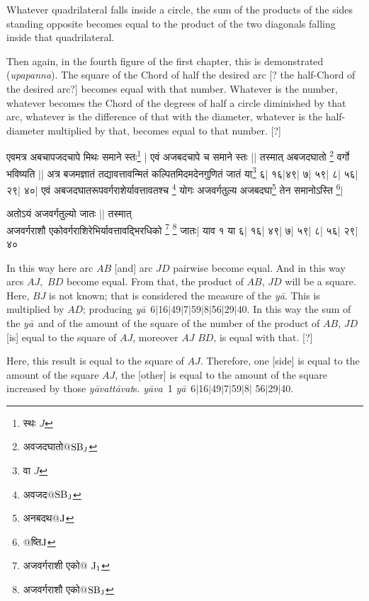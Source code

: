 \documentclass[11pt,a5paper]{book}
\def\yavattavat{\textit{y\=avatt\=avat}}
\def\ya{\textit{y\=a}}
\def\yava{\textit{y\=ava}}
\def\danda{$|$}
\begin{document}
Whatever quadrilateral falls inside a circle, the sum of the 
products of the sides standing opposite becomes equal to the
product of the two diagonals falling inside that quadrilateral. 

Then again, in the fourth figure of the first chapter, this is demonstrated (\textit{upapanna}). The square
of the Chord of half the desired arc [? the half-Chord of the desired
arc?] becomes equal with that number. Whatever is the number, whatever becomes
the Chord of the degrees of half a circle diminished by that arc, whatever is the difference 
of that with the diameter, whatever is the half-diameter multiplied by that, becomes 
equal to that number. [?] 

\newpage
{\s एवमत्र अबचापजदचापे मिथः समाने स्तः\footnote{{\s स्थः} $J$} |
एवं अजबदचापे च समाने स्तः ||
तस्मात् अबजदघातो \footnote{{\s अवजदघातो@}${\rm SB_J}$} वर्गो भविष्यति ||
अत्र बजमज्ञातं तद्यावत्तावन्मितं कल्पितमिदमदेनगुणितं
जातं या\footnote{{\s वा} $J$} ६| १६|४९| ७| ५९| ८| ५६| २९| ४०|
एवं अबजदघातरूपवर्गराशेर्यावत्तावतश्च \footnote{{\s अवजद@}${\rm SB_J}$} योगः
अजवर्गतुल्य अजबदघा\footnote{{\s अनबदथ@}${\rm J}$} तेन समानोऽस्ति \footnote{{\s @ष्ति}${\rm J}$}|

अतोऽयं अजवर्गतुल्यो जातः ||
तस्मात् \\
अजवर्गराशौ एकोवर्गराशिरेभिर्यावत्तावद्भिरधिको
\footnote{{\s अजवर्गराशी एको@ }${\rm J_1}$}
\footnote{{\s अजवर्गराशौ एको@}${\rm SB_J}$}
जातः|
याव १ या ६| १६| ४९| ७| ५९| ८| ५६| २९| ४०}


\newpage
In this way here arc $AB$ [and] arc $JD$ pairwise become equal. 
And in this way arcs $AJ,$  $BD$ become equal.
From that, the product of $AB$, $JD$ will be a square. Here, $BJ$ is not known;
that is considered the measure of the \ya. This is multiplied by $AD$; producing \ya\
6\danda 16\danda 49\danda 7\danda 59\danda 8\danda 56\danda 29\danda 40.
In this way the sum of the \ya\
and of the amount of the square of the number of the product of $AB$, $JD$
[is] equal to the square of $AJ$, moreover $AJ$ $BD$, is equal with that. [?]


Here, this result is equal to the square of $AJ$. Therefore, one [side] is equal to the amount of the square
$AJ$, the [other] is equal to the amount of the square increased by those \yavattavat s. \yava\ 1 \ya\ 6\danda 16\danda 49\danda 7\danda 59\danda 8\danda
56\danda 29\danda 40. 
\end{document}

